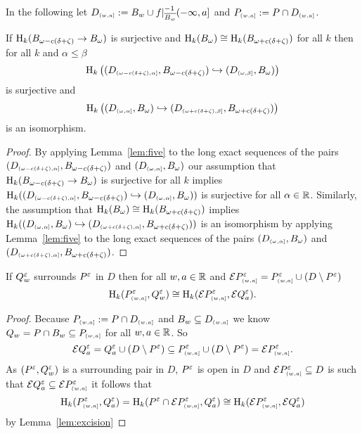 
In the following let $D\subi{w,a} := B_w\cup f\rest_{\comp{B_w}}^{-1}(-\infty,a]$ and $P\subi{w,a} := P\cap D\subi{w,a}$.

\begin{lemma}\label{lem:pt_interleaving}
  If $\hom_k(\b\to\B)$ is surjective and $\hom_k(\B)\cong \hom_k(\BB)$ for all $k$ then for all $k$ and $\alpha\leq\beta$
  \[\hom_k\left((D\subi{\omega-c(\delta+\zeta),\alpha},B_{\omega-c(\delta+\zeta)})\hookrightarrow (D\subi{\omega,\beta},B_{\omega})\right)\]
  is surjective and
  \[ \hom_k\left( (D\subi{\omega,\alpha},B_\omega)\hookrightarrow (D\subi{\omega+c(\delta+\zeta),\beta},B_{\omega+c(\delta+\zeta)}) \right)\]
  is an isomorphism.
\end{lemma}
\begin{proof}
  By applying Lemma~\ref{lem:five} to the long exact sequences of the pairs $(D\subi{\omega-c(\delta+\zeta),\alpha},\b)$ and $(D\subi{\omega,\alpha},\B)$ our assumption that $\hom_k(\b\to\B)$ is surjective for all $k$ implies $\hom_k((D\subi{\omega-c(\delta+\zeta),\alpha},\b)\hookrightarrow (D\subi{\omega,\alpha},\B))$ is surjective for all $\alpha\in\R$.
  Similarly, the assumption that $\hom_k(\B)\cong \hom_k(\BB)$ implies $\hom_k((D\subi{\omega,\alpha},\B)\hookrightarrow (D\subi{\omega+c(\delta+\zeta),\alpha},\BB))$ is an isomorphism by applying Lemma~\ref{lem:five} to the long exact sequences of the pairs $(D\subi{\omega,\alpha},\B)$ and $(D\subi{\omega+c(\delta+\zeta),\alpha},\BB)$.
\end{proof}

\begin{lemma}\label{lem:extension_apply}
  If $Q_w^\e$ surrounds $P^\e$ in $D$ then for all $w,a\in\R$ and $\ext{P\subi{w,a}^\e} = P\subi{w,a}^\e \cup (D\setminus P^\e)$
  \[\hom_k(P\subi{w,a}^\e, Q_w^\e)\cong \hom_k(\ext{P\subi{w,a}^\e}, \ext{Q^\e_a}).\]
\end{lemma}
\begin{proof}
  Because $P\subi{w,a} := P\cap D\subi{w,a}$ and $B_w\subseteq D\subi{w,a}$ we know $Q_w = P\cap B_w \subseteq P\subi{w,a}$ for all $w,a\in\R$.
  So
  \[\ext{Q^\e_a} = Q^\e_a\cup (D\setminus P^\e) \subseteq P\subi{w,a}^\e \cup (D\setminus P^\e) = \ext{P\subi{w,a}^\e}.\]
  As $(P^\e, Q_w^\e)$ is a surrounding pair in $D$, $P^\e$ is open in $D$ and $\ext{P\subi{w,a}^\e}\subseteq D$ is such that $\ext{Q^\e_a}\subseteq \ext{P\subi{w,a}^\e}$ it follows that
  \[\hom_k(P\subi{w,a}^\e, Q^\e_a) = \hom_k(P^\e\cap \ext{P\subi{w,a}^\e}, Q^\e_a) \cong\hom_k(\ext{P\subi{w,a}^\e}, \ext{Q^\e_a})\]
  by Lemma~\ref{lem:excision}
\end{proof}

